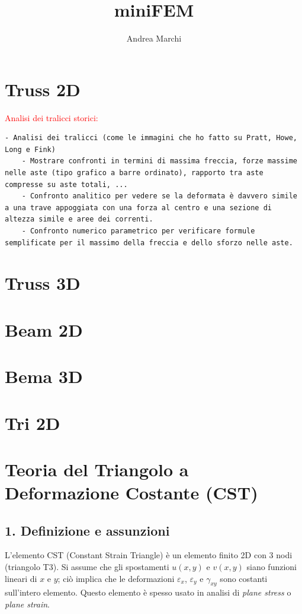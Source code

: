 \documentclass{article}
\begin{document}
\title{miniFEM}
\author{Andrea Marchi}

\maketitle
\tableofcontents

\section{Truss 2D}

\textcolor{red}{Analisi dei tralicci storici:}
\begin{verbatim}
- Analisi dei tralicci (come le immagini che ho fatto su Pratt, Howe, Long e Fink)
	- Mostrare confronti in termini di massima freccia, forze massime nelle aste (tipo grafico a barre ordinato), rapporto tra aste compresse su aste totali, ...
	- Confronto analitico per vedere se la deformata è davvero simile a una trave appoggiata con una forza al centro e una sezione di altezza simile e aree dei correnti.
	- Confronto numerico parametrico per verificare formule semplificate per il massimo della freccia e dello sforzo nelle aste.
\end{verbatim}

\section{Truss 3D}

\section{Beam 2D}
\section{Bema 3D}

\section{Tri 2D}

\section*{Teoria del Triangolo a Deformazione Costante (CST)}

\subsection*{1. Definizione e assunzioni}
L'elemento CST (Constant Strain Triangle) è un elemento finito 2D con 3 nodi (triangolo T3). Si assume che gli spostamenti \(u(x,y)\) e \(v(x,y)\) siano funzioni lineari di \(x\) e \(y\); ciò implica che le deformazioni \(\varepsilon_x\), \(\varepsilon_y\) e \(\gamma_{xy}\) sono costanti sull'intero elemento.  
Questo elemento è spesso usato in analisi di \emph{plane stress} o \emph{plane strain}.
\end{document}
